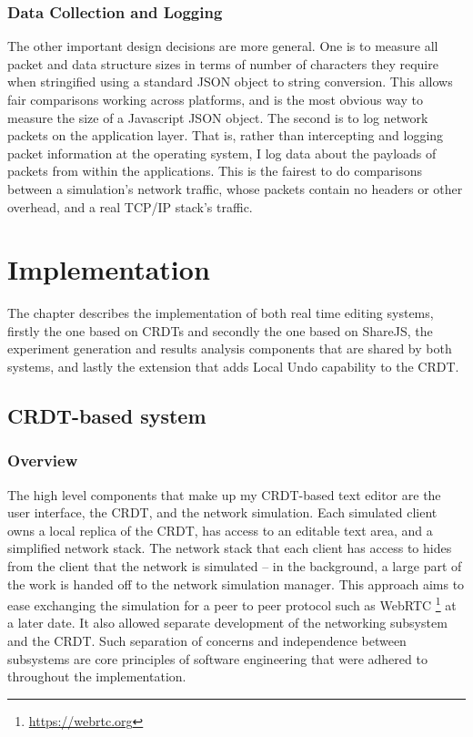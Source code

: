 \documentclass[12pt,a4paper,twoside,openright]{report}
\begin{document}

	\subsection{Data Collection and Logging}
	The other important design decisions are more general. One is to measure all packet and data structure sizes in terms of number of characters they require when stringified using a standard JSON object to string conversion. This allows fair comparisons working across platforms, and is the most obvious way to measure the size of a Javascript JSON object. The second is to log network packets on the application layer. That is, rather than intercepting and logging packet information at the operating system, I log data about the payloads of packets from within the applications. This is the fairest to do comparisons between a simulation's network traffic, whose packets contain no headers or other overhead, and a real TCP/IP stack's traffic.


\chapter{Implementation}

The chapter describes the implementation of both real time editing systems, firstly the one based on CRDTs and secondly the one based on ShareJS, the experiment generation and results analysis components that are shared by both systems, and lastly the extension that adds Local Undo capability to the CRDT.


\section{CRDT-based system}

	\subsection{Overview}
	The high level components that make up my CRDT-based text editor are the user interface, the CRDT, and the network simulation. Each simulated client owns a local replica of the CRDT, has access to an editable text area, and a simplified network stack. The network stack that each client has access to hides from the client that the network is simulated -- in the background, a large part of the work is handed off to the network simulation manager. This approach aims to ease exchanging the simulation for a peer to peer protocol such as WebRTC \footnote{\url{https://webrtc.org}} at a later date. It also allowed separate development of the networking subsystem and the CRDT. Such separation of concerns and independence between subsystems are core principles of software engineering that were adhered to throughout the implementation.
	
\end{document}
